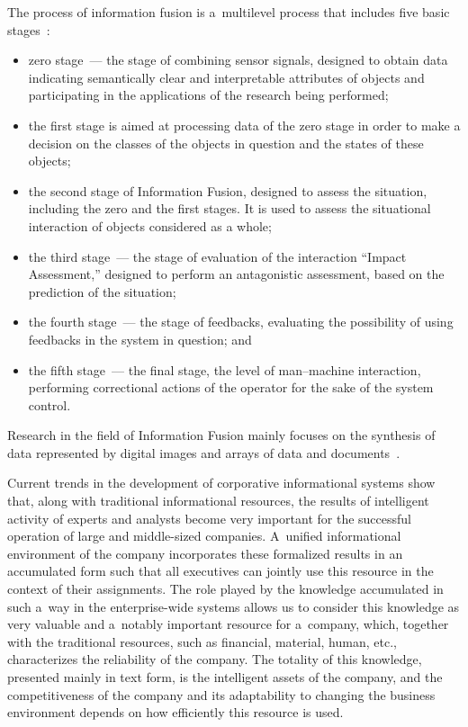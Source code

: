 \begin{multicols}{2}
     The process of information fusion is a~multilevel process that includes five 
basic stages~\cite{2-d, 3-d, 4-d}:
     \begin{itemize}
\item zero stage~--- the stage of combining sensor signals, designed to obtain 
data indicating semantically clear and interpretable attributes of objects and 
participating in the applications of the research being performed;
\item the first stage is aimed at processing data of the zero stage in order to 
make a decision on the classes of the objects in question and the states of these 
objects;
\item the second stage of Information Fusion, designed to assess the situation, 
including the zero and the first stages. It is used to assess the situational 
interaction of objects considered as a whole;
\item the third stage~--- the stage of evaluation of the interaction ``Impact 
Assessment,'' designed to perform an antagonistic assessment, based on the 
prediction of the situation;
\item the fourth stage~--- the stage of feedbacks, evaluating the possibility of 
using feedbacks in the system in question; and
\item the fifth stage~--- the final stage, the level of man--machine interaction, 
performing correctional actions of the operator for the sake of the system 
control.
\end{itemize}

     Research in the field of Information Fusion mainly focuses on the synthesis 
of data represented by digital images and arrays of data and  
documents~\cite{1-d, 4-d, 5-d}.
     
     Current trends in the development of corporative informational systems 
show that, along with traditional informational resources, the results of intelligent 
activity of experts and analysts become very important for the successful operation 
of large and middle-sized companies. A~unified informational environment of the 
company incorporates these formalized results in an accumulated form such that 
all executives can jointly use this resource in the context of their assignments. The 
role played by the knowledge accumulated in such a~way in the enterprise-wide 
systems allows us to consider this knowledge as very valuable and a~notably 
important resource for a~company, which, together with the traditional resources, 
such as financial, material, human, etc., characterizes the reliability of the 
company. The totality of this knowledge, presented mainly in text form, is the 
intelligent assets of the company, and the competitiveness of the company and its 
adaptability to changing the business environment depends on how efficiently this 
resource is used.
{

}
\end{multicols}
